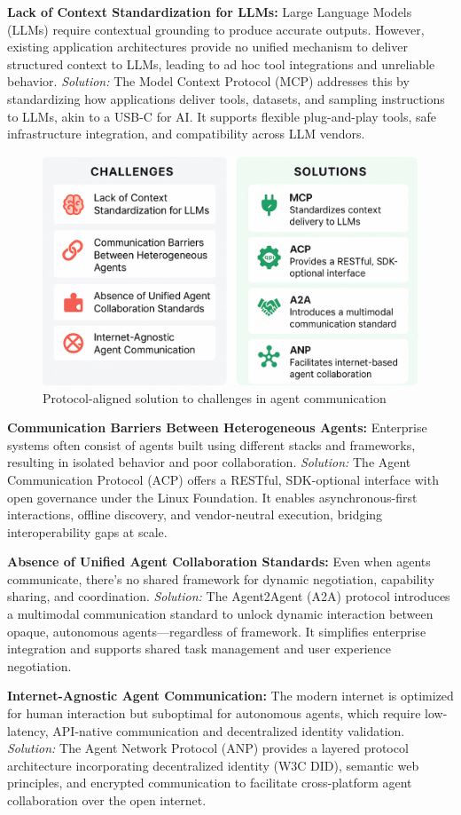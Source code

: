 \documentclass{article}
\begin{document}
\textbf{Lack of Context Standardization for LLMs:}
Large Language Models (LLMs) require contextual grounding to produce accurate outputs. However, existing application architectures provide no unified mechanism to deliver structured context to LLMs, leading to ad hoc tool integrations and unreliable behavior.
\textit{Solution:} The Model Context Protocol (MCP) addresses this by standardizing how applications deliver tools, datasets, and sampling instructions to LLMs, akin to a USB-C for AI. It supports flexible plug-and-play tools, safe infrastructure integration, and compatibility across LLM vendors.

\begin{figure}[b]
    \centering
    \includegraphics[width=0.5\linewidth]{security_challenges.png}
    \caption{Protocol-aligned solution to challenges in agent communication}
    \label{fig:enter-label}
\end{figure}


\textbf{Communication Barriers Between Heterogeneous Agents:}
Enterprise systems often consist of agents built using different stacks and frameworks, resulting in isolated behavior and poor collaboration.
\textit{Solution:} The Agent Communication Protocol (ACP) offers a RESTful, SDK-optional interface with open governance under the Linux Foundation. It enables asynchronous-first interactions, offline discovery, and vendor-neutral execution, bridging interoperability gaps at scale.

\textbf{Absence of Unified Agent Collaboration Standards:}
Even when agents communicate, there's no shared framework for dynamic negotiation, capability sharing, and coordination.
\textit{Solution:} The Agent2Agent (A2A) protocol introduces a multimodal communication standard to unlock dynamic interaction between opaque, autonomous agents—regardless of framework. It simplifies enterprise integration and supports shared task management and user experience negotiation.





\textbf{Internet-Agnostic Agent Communication:}
The modern internet is optimized for human interaction but suboptimal for autonomous agents, which require low-latency, API-native communication and decentralized identity validation.
\textit{Solution:} The Agent Network Protocol (ANP) provides a layered protocol architecture incorporating decentralized identity (W3C DID), semantic web principles, and encrypted communication to facilitate cross-platform agent collaboration over the open internet.
\end{document}
